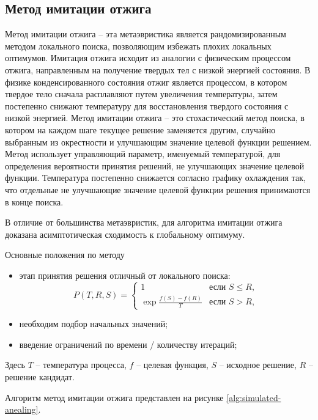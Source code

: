 \subsection{Метод имитации отжига}
Метод имитации отжига -- эта метаэвристика является рандомизированным методом локального поиска, 
позволяющим избежать плохих локальных оптимумов. Имитация отжига исходит из аналогии с физическим процессом 
отжига, направленным на получение твердых тел с низкой энергией состояния. В физике конденсированного 
состояния отжиг является процессом, в котором твердое тело сначала расплавляют путем увеличения температуры, 
затем постепенно снижают температуру для восстановления твердого состояния с низкой энергией. Метод имитации 
отжига -- это стохастический метод поиска, в котором на каждом шаге текущее решение заменяется другим, 
случайно выбранным из окрестности и улучшающим значение целевой функции решением. Метод использует 
управляющий параметр, именуемый температурой, для определения вероятности принятия решений, не улучшающих 
значение целевой функции. Температура постепенно снижается согласно графику охлаждения так, что отдельные не 
улучшающие значение целевой функции решения принимаются в конце поиска.

В отличие от большинства метаэвристик, для алгоритма имитации отжига доказана асимптотическая сходимость к 
глобальному оптимуму. 

Основные положения по методу
\begin{itemize}
    \item этап принятия решения отличный от локального поиска:
    \[
        P(T, R, S)= \left\{\begin{array}{cc}
            1                       & \text{если } S \leq R, \\
            \exp\frac{f(S)-f(R)}{T} & \text{если } S > R,
        \end{array}\right.
    \]
    \item необходим подбор начальных значений;
    \item введение ограничений по времени / количеству итераций;
\end{itemize}

Здесь \( T \) -- температура процесса, \( f \) -- целевая функция, \( S \) -- исходное решение, 
\( R \) -- решение кандидат.

Алгоритм метод имитации отжига представлен на рисунке \ref{alg:simulated-anealing}.

\newpage

